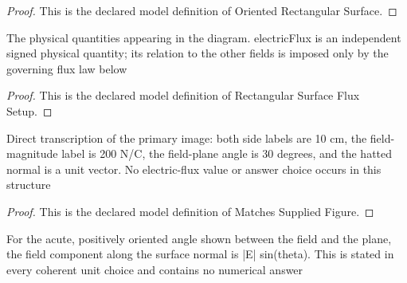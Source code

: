 \begin{proof}
  This is the declared model definition of Oriented Rectangular Surface.
\end{proof}
\begin{definition}
  \label{def:physics:phyx-mini-0843:phyxminiproblems-problemphyxmini0843-rectangularsurfacefluxsetup}
  The physical quantities appearing in the diagram. electricFlux is an independent signed physical quantity; its relation to the other fields is imposed only by the governing flux law below
\end{definition}
\begin{proof}
  This is the declared model definition of Rectangular Surface Flux Setup.
\end{proof}
\begin{definition}
  \label{def:physics:phyx-mini-0843:phyxminiproblems-problemphyxmini0843-matchessuppliedfigure}
  Direct transcription of the primary image: both side labels are 10 cm, the field-magnitude label is 200 N/C, the field-plane angle is 30 degrees, and the hatted normal is a unit vector. No electric-flux value or answer choice occurs in this structure
\end{definition}
\begin{proof}
  This is the declared model definition of Matches Supplied Figure.
\end{proof}
\begin{definition}
  \label{def:physics:phyx-mini-0843:phyxminiproblems-problemphyxmini0843-satisfiesfieldplaneanglegeometry}
  For the acute, positively oriented angle shown between the field and the plane, the field component along the surface normal is |E| sin(theta). This is stated in every coherent unit choice and contains no numerical answer
\end{definition}
